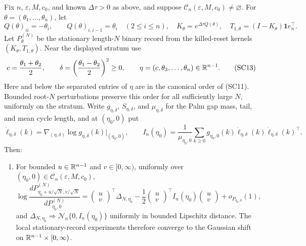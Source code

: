 \begin{paperthm}
\label{thm:stationary-serial-double-pole-main}
Fix \(n\), \(\varepsilon,M,c_0\), and known \(\Delta\tau>0\) as above, and
suppose \(\mathcal C_n(\varepsilon,M,c_0)\ne\varnothing\).  For
\(\theta=(\theta_1,\ldots,\theta_n)\), let
\[
 Q(\theta)_{ii}=-\theta_i,\qquad
 Q(\theta)_{i,i-1}=\theta_i\quad(2\le i\le n),
\quad K_\theta=e^{\Delta\tau Q(\theta)},
\quad T_{1,\theta}=(I-K_\theta)\mathbf1e_n^\top.
\tag{SC12}
\]
Let \(P_\theta^{(N)}\) be the stationary length-\(N\) binary record from the
killed-reset kernels \((K_\theta,T_{1,\theta})\).  Near the displayed
stratum use
\[
 c=\frac{\theta_1+\theta_2}{2},\qquad
\delta=\left(\frac{\theta_1-\theta_2}{2}\right)^2\ge0,
\qquad \eta=(c,\theta_3,\ldots,\theta_n)\in\mathbb{R}^{n-1}.
\tag{SC13}
\]
Here and below the separated entries of \(\eta\) are in the canonical order
of \textup{(SC11)}.  Bounded root-\(N\) perturbations preserve this order for
all sufficiently large \(N\), uniformly on the stratum.
Write \(g_{\eta,\delta}\), \(S_{\eta,\delta}\), and
\(\mu_{\eta,\delta}\) for the Palm gap mass, tail, and mean cycle length,
and at \((\eta_0,0)\) put
\[
 \dot\ell_{\eta,\delta}(k)
 =\nabla_{(\eta,\delta)}\log g_{\eta,\delta}(k)|_{(\eta_0,0)},
 \qquad
 I_n(\eta_0)=\frac1{\mu_{\eta_0,0}}
 \sum_{k\ge0}g_{\eta_0,0}(k)
 \dot\ell_{\eta,\delta}(k)\dot\ell_{\eta,\delta}(k)^\top.
\tag{SC14}
\]
Then:

\begin{enumerate}[label=\textup{(\roman*)},leftmargin=2.6em]
\item For bounded \(u\in\mathbb{R}^{n-1}\) and \(v\in[0,\infty)\), uniformly over
\((\eta_0,0)\in\mathcal C_n(\varepsilon,M,c_0)\),
\[
 \log\frac{dP_{\eta_0+u/\sqrt N,v/\sqrt N}^{(N)}}
               {dP_{\eta_0,0}^{(N)}}
 =\begin{pmatrix}u\\v\end{pmatrix}^{\!\top}\Delta_{N,\eta_0}
 -\frac12\begin{pmatrix}u\\v\end{pmatrix}^{\!\top}
 I_n(\eta_0)\begin{pmatrix}u\\v\end{pmatrix}
 +o_{P_{\eta_0,0}}(1),
\tag{SC15}
\]
and \(\Delta_{N,\eta_0}\Rightarrow
\mathcal N_n\{0,I_n(\eta_0)\}\) uniformly in bounded Lipschitz distance.
The local stationary-record experiments therefore converge to the Gaussian
shift on \(\mathbb{R}^{n-1}\times[0,\infty)\).


\end{enumerate}
\end{paperthm}
